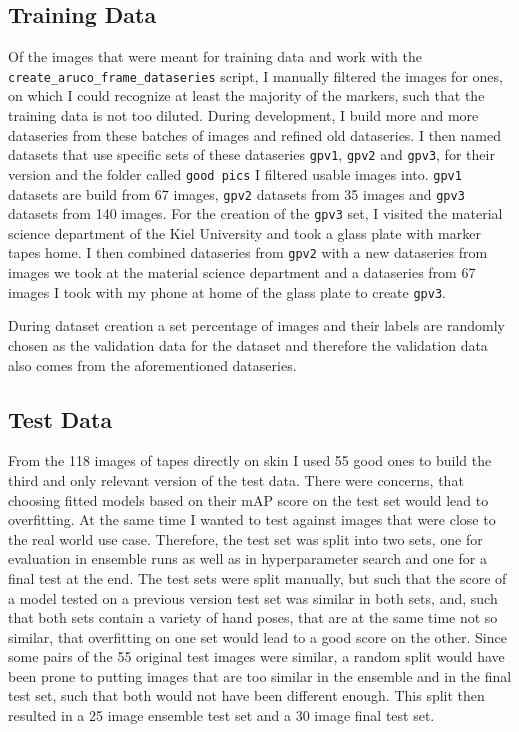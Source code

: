 \documentclass[10pt]{book}
\begin{document}
\subsection{Training Data}

Of the images that were meant for training data and work with the \texttt{create\_aruco\_frame\_dataseries} script, I manually filtered the images for ones, on which I could recognize at least the majority of the markers, such that the training data is not too diluted. During development, I build more and more dataseries from these batches of images and refined old dataseries. I then named datasets that use specific sets of these dataseries \texttt{gpv1}, \texttt{gpv2} and \texttt{gpv3}, for their version and the folder called \texttt{good pics} I filtered usable images into. \texttt{gpv1} datasets are build from 67 images, \texttt{gpv2} datasets from 35 images and \texttt{gpv3} datasets from 140 images. For the creation of the \texttt{gpv3} set, I visited the material science department of the Kiel University and took a glass plate with marker tapes home. I then combined dataseries from \texttt{gpv2} with a new dataseries from images we took at the material science department and a dataseries from 67 images I took with my phone at home of the glass plate to create \texttt{gpv3}.

During dataset creation a set percentage of images and their labels are randomly chosen as the validation data for the dataset and therefore the validation data also comes from the aforementioned dataseries.

\subsection{Test Data}

From the 118 images of tapes directly on skin I used 55 good ones to build the third and only relevant version of the test data. There were concerns, that choosing fitted models based on their \ac{mAP} score on the test set would lead to overfitting. At the same time I wanted to test against images that were close to the real world use case. Therefore, the test set was split into two sets, one for evaluation in ensemble runs as well as in hyperparameter search and one for a final test at the end. The test sets were split manually, but such that the score of a model tested on a previous version test set was similar in both sets, and, such that both sets contain a variety of hand poses, that are at the same time not so similar, that overfitting on one set would lead to a good score on the other. Since some pairs of the 55 original test images were similar, a random split would have been prone to putting images that are too similar in the ensemble and in the final test set, such that both would not have been different enough. This split then resulted in a 25 image ensemble test set and a 30 image final test set.
\end{document}
